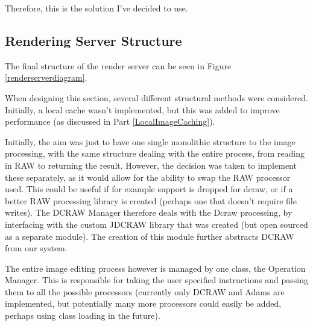 \documentclass[10pt,a4paper]{article}
\begin{document}
Therefore, this is the solution I've decided to use.

\subsection{Rendering Server Structure}
The final structure of the render server can be seen in Figure \ref{renderserverdiagram}.

When designing this section, several different structural methods were considered. Initially, a local
cache wasn't implemented, but this was added to improve performance (as discussed in Part \ref{LocalImageCaching}).

Initially, the aim was just to have one single monolithic structure to the image processing, with the same structure
dealing with the entire process, from reading in RAW to returning the result. However, the decision was taken to
implement these separately, as it would allow for the ability to swap the RAW processor used. This could be useful
if for example support is dropped for dcraw, or if a better RAW processing library is created (perhaps one that doesn't 
require file writes). The DCRAW Manager therefore deals with the Dcraw processing, by interfacing with the custom JDCRAW
library that was created (but open sourced as a separate module). The creation of this module further abstracts DCRAW from
our system.

The entire image editing process however is managed by one class, the Operation Manager. This is responsible for taking the user
specified instructions and passing them to all the possible processors (currently only DCRAW and Adams are implemented, but potentially
many more processors could easily be added, perhaps using class loading in the future).
\end{document}
